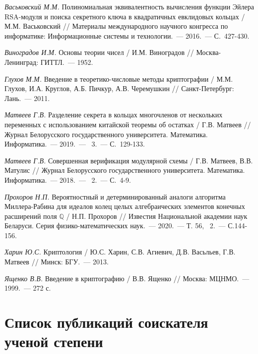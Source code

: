 \begin{thebibliography}{99}
    \textit{Васьковский М.М.} Полиномиальная эквивалентность вычисления функции Эйлера RSA-модуля и поиска секретного ключа в квадратичных евклидовых кольцах / М.М. Васьковский // Материалы международного научного конгресса по информатике: Информационные системы и технологии.~--- 2016.~--- С.~427-430.

    \textit{Виноградов И.М.} Основы теории чисел / И.М. Виноградов // Москва-Ленинград: ГИТТЛ.~--- 1952.

    \textit{Глухов М.М.} Введение в теоретико-числовые методы криптографии / М.М. Глухов, И.А. Круглов, А.Б. Пичкур, А.В. Черемушкин // Санкт-Петербург: Лань.~--- 2011.
    
    \textit{Матвеев Г.В.} Разделение секрета в кольцах многочленов от нескольких переменных с использованием китайской теоремы об остатках / Г.В. Матвеев // Журнал Белорусского государственного университета. Математика. Информатика.~--- 2019.~--- \textnumero~3.~--- С.~129-133.
    
    \textit{Матвеев Г.В.} Совершенная верификация модулярной схемы / Г.В. Матвеев, В.В. Матулис // Журнал Белорусского государственного университета. Математика. Информатика.~--- 2018.~--- \textnumero~2.~--- С.~4-9.

    \textit{Прохоров Н.П.} Вероятностный и детерминированный аналоги алгоритма Миллера-Рабина для идеалов колец целых алгебраических элементов конечных расширений поля $\mathbb{Q}$ / Н.П. Прохоров // Известия Национальной академии наук Беларуси. Серия физико-математических наук.~--- 2020.~--- Т. 56, \textnumero~2.~--- С.144-156.
    
    \textit{Харин Ю.С.} Криптология / Ю.С. Харин, С.В. Агиевич, Д.В. Васьльев, Г.В. Матвеев // Минск: БГУ.~--- 2013.

    \textit{Ященко В.В.} Введение в криптографию / В.В. Ященко // Москва: МЦНМО.~--- 1999.~--- 272 с.

\end{thebibliography}

\newpage
\section*{Список публикаций соискателя ученой степени}

\renewcommand{\labelenumi}{\arabic{enumi}--A}
\renewcommand{\theenumi}{\arabic{enumi}--A}

